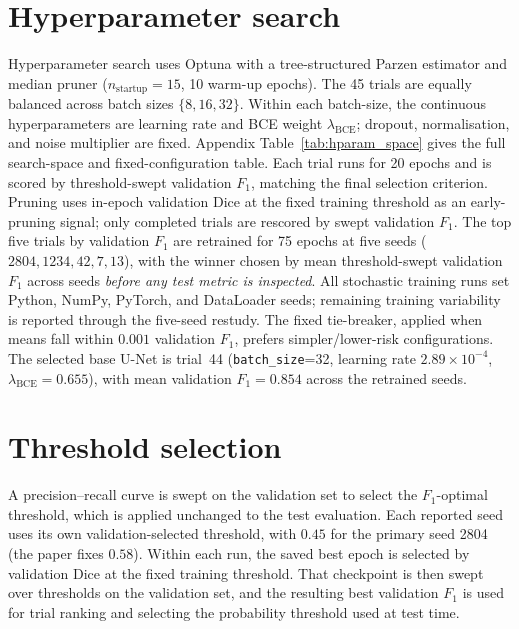 \documentclass{cam-thesis}
\begin{document}
\section{Hyperparameter search}
\label{sec:optuna}

Hyperparameter search uses Optuna \citep{akiba2019} with a tree-structured
Parzen estimator and median pruner ($n_{\mathrm{startup}}=15$, 10 warm-up
epochs). The 45 trials are equally balanced across batch sizes $\{8,16,32\}$.
Within each batch-size, the continuous hyperparameters are learning rate and BCE weight
$\lambda_{\mathrm{BCE}}$; dropout, normalisation, and noise multiplier are
fixed. Appendix Table~\ref{tab:hparam_space} gives the full search-space and
fixed-configuration table. Each trial runs for 20 epochs and is scored by
threshold-swept validation $F_1$, matching the final selection criterion.
Pruning uses in-epoch validation Dice at the fixed training threshold as an
early-pruning signal; only completed trials are rescored by swept
validation $F_1$. The top five trials by validation $F_1$ are retrained for 75
epochs at five seeds ($2804, 1234, 42, 7, 13$), with the winner chosen by mean
threshold-swept validation $F_1$ across seeds \emph{before any test metric is
inspected}. All stochastic training runs set Python, NumPy, PyTorch, and
DataLoader seeds; remaining training variability is reported through the
five-seed restudy. The fixed tie-breaker, applied when means fall within
$0.001$ validation $F_1$, prefers simpler/lower-risk configurations.
The selected base U-Net is trial~44 (\texttt{batch\_size}=32,
learning rate $2.89\times10^{-4}$, $\lambda_{\mathrm{BCE}}=0.655$), with
mean validation $F_1=0.854$ across the retrained seeds.

\section{Threshold selection}
\label{sec:threshold}

A precision--recall curve is swept on the validation set to select the
$F_1$-optimal threshold, which is applied unchanged to the test evaluation.
Each reported seed uses its own validation-selected threshold, with $0.45$ for
the primary seed 2804 (the paper fixes $0.58$). Within each run, the saved
best epoch is selected by validation Dice at the fixed
training threshold. That checkpoint is then swept over thresholds on the
validation set, and the resulting best validation $F_1$ is used for trial ranking
and selecting the probability threshold used at test time.
\end{document}
